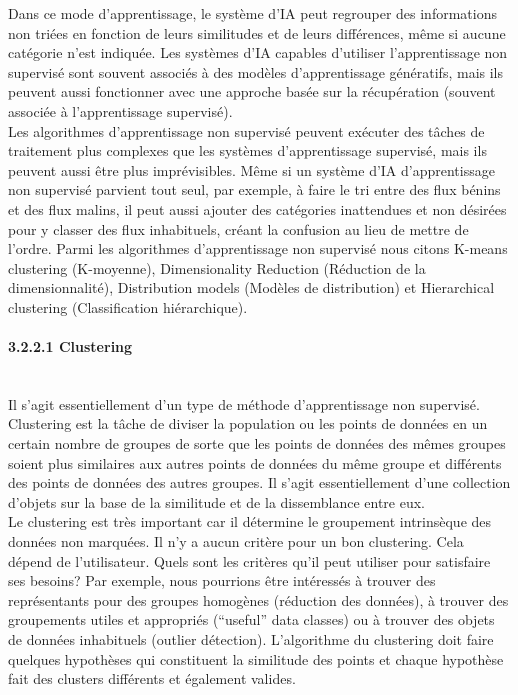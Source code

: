\noindent Dans ce mode d'apprentissage, le système d'IA peut regrouper des informations non triées en fonction de leurs similitudes et de leurs différences, même si aucune catégorie n'est indiquée. Les systèmes d'IA capables d'utiliser l'apprentissage non supervisé sont souvent associés à des modèles d'apprentissage génératifs, mais ils peuvent aussi fonctionner avec une approche basée sur la récupération (souvent associée à l'apprentissage supervisé).\\

\noindent Les algorithmes d'apprentissage non supervisé peuvent exécuter des tâches de traitement plus complexes que les systèmes d'apprentissage supervisé, mais ils peuvent aussi être plus imprévisibles. Même si un système d'IA d'apprentissage non supervisé parvient tout seul, par exemple, à faire le tri entre des flux bénins et des flux malins, il peut aussi ajouter des catégories inattendues et non désirées pour y classer des flux inhabituels, créant la confusion au lieu de mettre de l'ordre.
Parmi les algorithmes d’apprentissage non supervisé nous citons K-means clustering (K-moyenne), Dimensionality Reduction (Réduction de la dimensionnalité), Distribution models (Modèles de distribution) et Hierarchical clustering (Classification hiérarchique).\\

\newpage
\paragraph{{\large 3.2.2.1 Clustering}\\\\}
Il s'agit essentiellement d'un type de méthode d'apprentissage non supervisé. Clustering est la tâche de diviser la population ou les points de données en un certain nombre de groupes de sorte que les points de données des mêmes groupes soient plus similaires aux autres points de données du même groupe et différents des points de données des autres groupes. Il s'agit essentiellement d'une collection d'objets sur la base de la similitude et de la dissemblance entre eux.\\

\noindent Le clustering est très important car il détermine le groupement intrinsèque des données non marquées. Il n'y a aucun critère pour un bon clustering. Cela dépend de l'utilisateur. Quels sont les critères qu'il peut utiliser pour satisfaire ses besoins? Par exemple, nous pourrions être intéressés à trouver des représentants pour des groupes homogènes (réduction des données), à trouver des groupements utiles et appropriés (“useful” data classes) ou à trouver des objets de données inhabituels (outlier détection). L'algorithme du clustering doit faire quelques hypothèses qui constituent la similitude des points et chaque hypothèse fait des clusters différents et également valides. 

